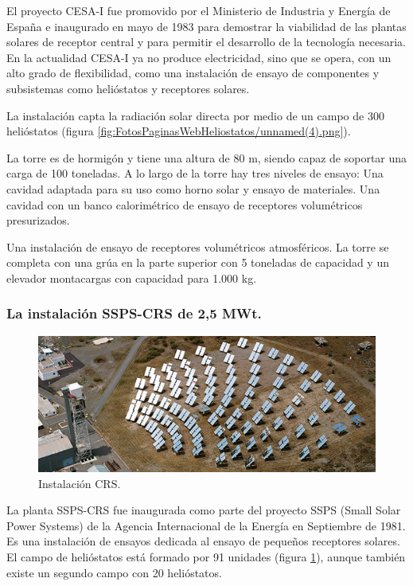 El proyecto CESA-I fue promovido por el Ministerio de Industria y Energía de España e inaugurado en mayo de 1983 para demostrar la viabilidad de las plantas solares de receptor central y para permitir el desarrollo de la tecnología necesaria. En la actualidad CESA-I ya no produce electricidad, sino que se opera, con un alto grado de flexibilidad, como una instalación de ensayo de componentes y subsistemas como helióstatos y receptores solares.

La instalación capta la radiación solar directa por medio de un campo de 300 helióstatos (figura \ref{fig:FotosPaginasWebHeliostatos/unnamed(4).png}).

La torre es de hormigón y tiene una altura de 80 m, siendo capaz de soportar una carga de 100 toneladas. A lo largo de la torre hay tres niveles de ensayo:
Una cavidad adaptada para su uso como horno solar y ensayo de materiales.
Una cavidad con un banco calorimétrico de ensayo de receptores volumétricos presurizados.

Una instalación de ensayo de receptores volumétricos atmosféricos.
La torre se completa con una grúa en la parte superior con 5 toneladas de capacidad y un elevador montacargas con capacidad para 1.000 kg. \cite{PSA3WebSite}



\subsubsection{La instalación SSPS-CRS de 2,5 MWt.}

\begin{figure}[h!]
  	\centering
	\includegraphics[width=\textwidth]{FotosPaginasWebHeliostatos/unnamed(6).png}
	\caption{Instalación CRS.~\cite{PSA2WebSite}
	\label{fig:FotosPaginasWebHeliostatos/unnamed(6).png}}
\end{figure}

La planta SSPS-CRS fue inaugurada como parte del proyecto SSPS (Small Solar Power Systems) de la Agencia Internacional de la Energía en Septiembre de 1981.
Es una instalación de ensayos dedicada al ensayo de pequeños receptores solares. El campo de helióstatos está formado por 91 unidades (figura \ref{fig:FotosPaginasWebHeliostatos/unnamed(6).png}), aunque también existe un segundo campo con 20 helióstatos.

